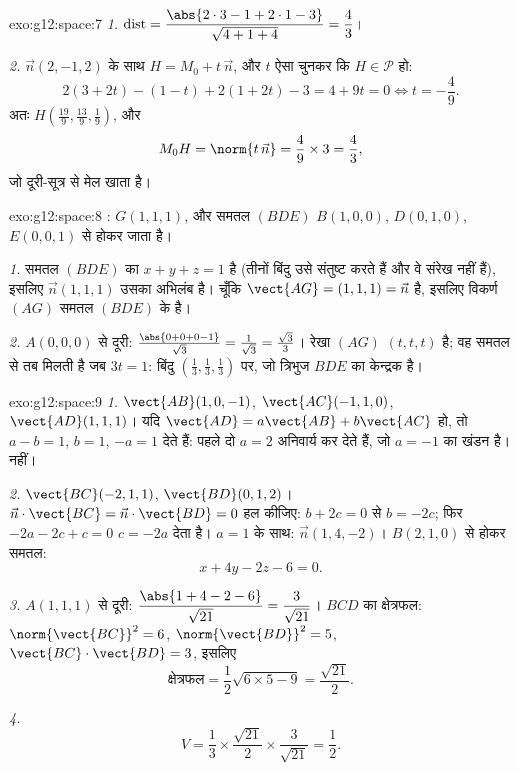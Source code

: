\begin{solution}{exo:g12:space:7}
\emph{1.} $\operatorname{dist} = \dfrac{\abs{2\cdot3 - 1 + 2\cdot1 - 3}}
{\sqrt{4 + 1 + 4}} = \dfrac{4}{3}$।

\emph{2.} $\vec n(2, -1, 2)$ के साथ $H = M_0 + t\,\vec n$, और $t$ ऐसा चुनकर कि $H \in \mathcal P$ हो:
\[
2(3 + 2t) - (1 - t) + 2(1 + 2t) - 3 = 4 + 9t = 0 \iff t = -\frac49 .
\]
अतः $H\left(\frac{19}{9}, \frac{13}{9}, \frac19\right)$, और
\[
M_0H = \norm{t\,\vec n} = \frac49 \times 3 = \frac43,
\]
जो दूरी-सूत्र से मेल खाता है।
\end{solution}

\begin{solution}{exo:g12:space:8}
: $G(1,1,1)$, और समतल $(BDE)$ $B(1,0,0)$, $D(0,1,0)$, $E(0,0,1)$ से होकर जाता है।

\emph{1.} समतल $(BDE)$ का  $x + y + z = 1$ है (तीनों बिंदु उसे संतुष्ट करते हैं और वे
संरेख नहीं हैं), इसलिए $\vec n(1,1,1)$ उसका अभिलंब है। चूँकि $\vect{AG} = (1,1,1) = \vec n$ है, इसलिए विकर्ण $(AG)$
समतल $(BDE)$ के  है।

\emph{2.} $A(0,0,0)$ से दूरी: $\frac{\abs{0 + 0 + 0 - 1}}{\sqrt3} = \frac{1}{\sqrt3} = \frac{\sqrt3}{3}$। रेखा $(AG)$ $(t, t, t)$ है; वह समतल से तब मिलती है जब
$3t = 1$: बिंदु $\left(\frac13, \frac13, \frac13\right)$ पर, जो त्रिभुज $BDE$ का केन्द्रक है।
\end{solution}

\begin{solution}{exo:g12:space:9}
\emph{1.} $\vect{AB}(1, 0, -1)$, $\vect{AC}(-1, 1, 0)$, $\vect{AD}(1, 1, 1)$। यदि $\vect{AD} = a\vect{AB} + b\vect{AC}$ हो, तो  $a - b = 1$, $b = 1$, $-a = 1$ देते
हैं: पहले दो $a = 2$ अनिवार्य कर देते हैं, जो $a = -1$ का खंडन है।  नहीं।

\emph{2.} $\vect{BC}(-2, 1, 1)$, $\vect{BD}(0, 1, 2)$। $\vec n \cdot \vect{BC} = \vec n \cdot \vect{BD} = 0$ हल कीजिए: $b + 2c = 0$ से $b = -2c$; फिर $-2a - 2c + c = 0$ $c = -2a$ देता है।
$a = 1$ के साथ: $\vec n(1, 4, -2)$। $B(2,1,0)$ से होकर समतल:
\[
x + 4y - 2z - 6 = 0 .
\]

\emph{3.} $A(1,1,1)$ से दूरी: $\dfrac{\abs{1 + 4 - 2 - 6}}{\sqrt{21}} = \dfrac{3}{\sqrt{21}}$। $BCD$ का क्षेत्रफल: $\norm{\vect{BC}}^2 = 6$, $\norm{\vect{BD}}^2 = 5$, $\vect{BC}\cdot\vect{BD} = 3$, इसलिए
\[
\text{क्षेत्रफल} = \frac12\sqrt{6 \times 5 - 9} = \frac{\sqrt{21}}{2}.
\]

\emph{4.}
\[
V = \frac13 \times \frac{\sqrt{21}}{2} \times \frac{3}{\sqrt{21}}
= \frac12 .
\]
\end{solution}

